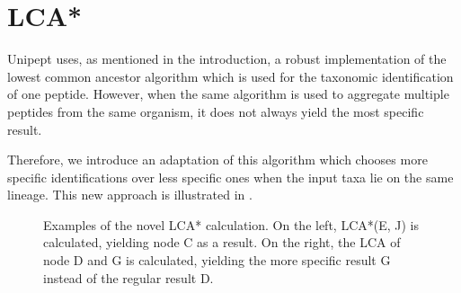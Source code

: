 \documentclass[twocolumn]{phdsymp}
\begin{document}
\section{LCA*} 

Unipept uses, as mentioned in the introduction, a robust implementation of the
lowest common ancestor algorithm which is used for the taxonomic identification
of one peptide. However, when the same algorithm is used to aggregate multiple
peptides from the same organism, it does not always yield the most specific
result.

Therefore, we introduce an adaptation of this algorithm which chooses more
specific identifications over less specific ones when the input taxa lie on the
same lineage. This new approach is illustrated in .

\begin{figure}[hbt]
	\centering
    \begin{subfigure}{0.45\columnwidth}
        \centering
        \caption{}
        \label{tikz:lca*ej}
    \end{subfigure}
    \begin{subfigure}{0.45\columnwidth}
        \centering
        \caption{}
        \label{tikz:lca*dg}
    \end{subfigure}
    \caption{Examples of the novel LCA* calculation. On the left, LCA*(E, J) is
    calculated, yielding node C as a result. On the right, the LCA of node D and
    G is calculated, yielding the more specific result G instead of the regular
    result D.} 
    \label{fig:lca*example}
\end{figure}
\end{document}
